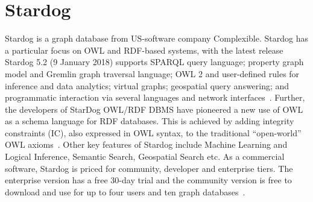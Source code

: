 \section{Stardog}
Stardog is a graph database from US-software company Complexible. Stardog has a particular 
focus on OWL and RDF-based systems, with the latest release Stardog 5.2 (9 January 2018) supports 
SPARQL query language; property graph model and Gremlin graph traversal language; OWL 2 and 
user-defined rules for inference and data analytics; virtual graphs; geospatial query answering; and 
programmatic interaction via several languages and network 
interfaces~\cite{hid-sp18-405-wwwdocs-stardog}. Further, the developers of StarDog OWL/RDF DBMS 
have pioneered a new use of OWL as a schema language for RDF databases. This is achieved by adding 
integrity constraints (IC), also expressed in OWL syntax, to the traditional ``open-world'' OWL 
axioms~\cite{hid-sp18-405-cer2012graphical-stardog}. Other key features of Stardog include Machine 
Learning and Logical Inference, Semantic Search, Geospatial Search etc. As a commercial software, 
Stardog is priced for community, developer and enterprise tiers. The enterprise version has a free 
30-day trial and the community version is free to download and use for up to four users and ten graph 
databases~\cite{hid-sp18-405-www-stardog}.



